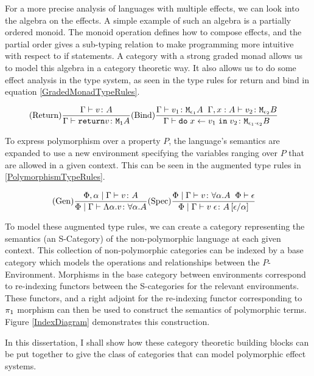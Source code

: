 \documentclass{Report}
\begin{document}
For a more precise analysis of languages with multiple effects, we can look into the algebra on the effects. A simple example of such an algebra is a partially ordered monoid. The monoid operation defines how to compose effects, and the partial order gives a sub-typing relation to make programming more intuitive with respect to if statements. A category with a strong graded monad allows us to model this algebra in a category theoretic way. It also allows us to do some effect analysis in the type system, as seen in the type rules for return and bind in equation \ref{GradedMonadTypeRules}.

\begin{eqnarray}\label{GradedMonadTypeRules}
    (\text{Return}) \frac{\Gamma \vdash v \colon A}{\Gamma \vdash \texttt{return} v \colon \texttt{M}_{\texttt{1}}{A}} & (\text{Bind}) \frac{\Gamma \vdash v_1 \colon \texttt{M}_{\epsilon_1}{A} \;\; \Gamma, x: A \vdash v_2 \colon \texttt{M}_{\epsilon_2}{B}}{\Gamma \vdash \texttt{do}\; x \leftarrow v_1 \;\texttt{in}\; v_2 \colon \texttt{M}_{\epsilon_1 \cdot \epsilon_2}{B}}
\end{eqnarray}


To express polymorphism over a property $P$, the language's semantics are expanded to use a new environment specifying the variables ranging over $P$ that are allowed in a given context. This can be seen in the augmented type rules in \ref{PolymorphismTypeRules}.

\begin{eqnarray}\label{PolymorphismTypeRules}
    (\text{Gen}) \frac{\Phi, \alpha\mid\Gamma \vdash v \colon A}{\Phi\mid\Gamma \vdash \Lambda \alpha. v \colon \forall \alpha. A}& (\text{Spec}) \frac{\Phi\mid\Gamma \vdash v \colon \forall \alpha. A\;\;\Phi\vdash \epsilon}{\Phi\mid\Gamma \vdash v\;\epsilon \colon A\left[\epsilon / \alpha\right]}
\end{eqnarray}

To model these augmented type rules, we can create a category representing the semantics (an S-Category) of the non-polymorphic language at each given context. This collection of non-polymorphic categories can be indexed by a base category which models the operations and relationships between the $P$-Environment. Morphisms in the base category between environments correspond to re-indexing functors between the S-categories for the relevant environments. These functors, and a right adjoint for the re-indexing functor corresponding to $\pi_1$ morphism can then be used to construct the semantics of polymorphic terms. Figure \ref{IndexDiagram} demonstrates this construction.

In this dissertation, I shall show how these category theoretic building blocks can be put together to give the class of categories that can model polymorphic effect systems.
\end{document}
